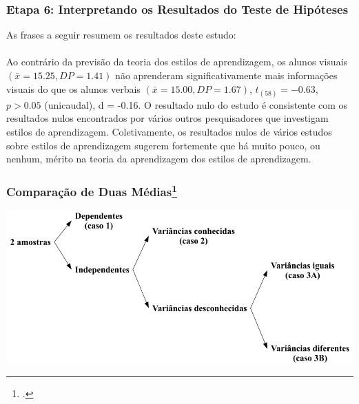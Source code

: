 \documentclass[11pt]{beamer}
\begin{document}
\begin{frame}
\frametitle{Etapa 6: Interpretando os Resultados do Teste de Hipóteses}

As frases a seguir resumem os resultados deste estudo:\\~\\

Ao contrário da previsão da teoria dos estilos de aprendizagem, os alunos visuais $(\bar{x} = 15.25, DP = 1.41)$ não aprenderam significativamente mais informações visuais do que os alunos verbais $(\bar{x} = 15.00, DP = 1.67)$, $t_{(58)} = -0.63$, $p > 0.05$ (unicaudal), d = -0.16. O resultado nulo do estudo é consistente com os resultados nulos encontrados por vários outros pesquisadores que investigam estilos de aprendizagem. Coletivamente, os resultados nulos de vários estudos sobre estilos de aprendizagem sugerem fortemente que há muito pouco, ou nenhum, mérito na teoria da aprendizagem dos estilos de aprendizagem.

\end{frame}

\begin{frame}
\frametitle{Comparação de Duas Médias\footcite{magalhaes2002noccoes}}

\begin{center}\includegraphics[width=1\linewidth]{figs/figure_9_1} \end{center}
\end{frame}
\end{document}
